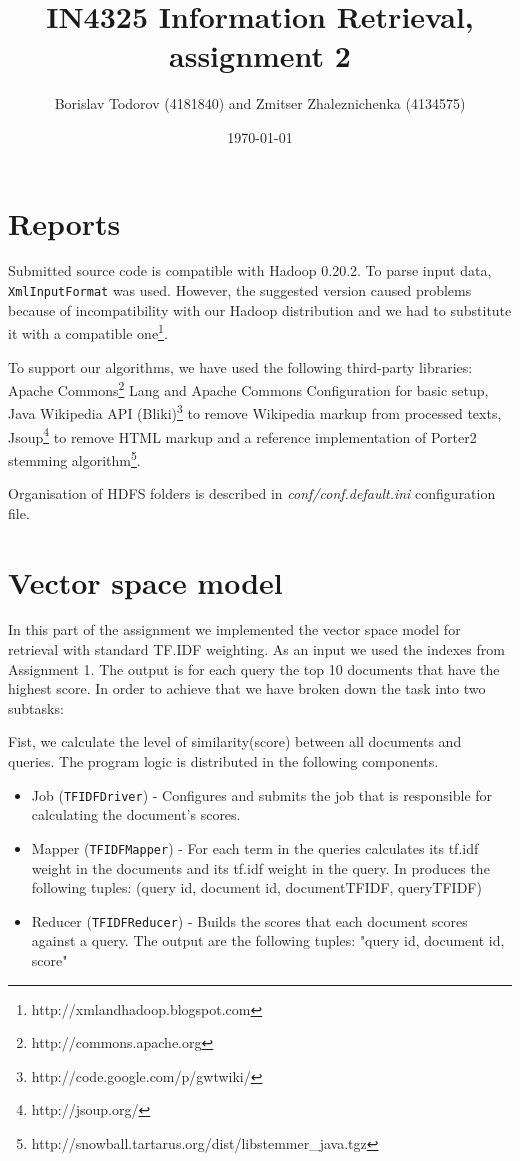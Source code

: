 \documentclass[a4paper, notitlepage]{article}
\begin{document}
\title{IN4325 Information Retrieval, assignment 2}
\author{Borislav Todorov (4181840) and Zmitser Zhaleznichenka (4134575)}
\date{\today}
\maketitle

\section{Reports}
Submitted source code is compatible with Hadoop 0.20.2. To parse input data, \lstinline{XmlInputFormat} was used. However, the suggested version caused problems because of incompatibility with our Hadoop distribution and we had to substitute it with a compatible one\footnote{http://xmlandhadoop.blogspot.com}.

To support our algorithms, we have used the following third-party libraries: Apache Commons\footnote{http://commons.apache.org} Lang and Apache Commons Configuration for basic setup, Java Wikipedia API (Bliki)\footnote{http://code.google.com/p/gwtwiki/} to remove Wikipedia markup from processed texts, Jsoup\footnote{http://jsoup.org/} to remove HTML markup and a reference implementation of Porter2 stemming algorithm\footnote{http://snowball.tartarus.org/dist/libstemmer\_java.tgz}.

Organisation of HDFS folders is described in \emph{conf/conf.default.ini} configuration file.

\section{Vector space model}
In this part of the assignment we implemented the vector space model for retrieval with standard TF.IDF weighting. As an input we used the indexes from Assignment 1. The output is for each query the top 10 documents that have the highest score. In order to achieve that we have broken down the task into two subtasks:

Fist, we calculate the level of similarity(score) between all documents and queries. The program logic is distributed in the following components.

\begin{itemize}
	\item Job (\lstinline{TFIDFDriver}) - Configures and submits the job that is responsible for calculating the document's scores.
	\item Mapper (\lstinline{TFIDFMapper}) - For each term in the queries calculates its tf.idf weight in the documents and its tf.idf weight in the query. In produces the following tuples: (query id, document id, documentTFIDF, queryTFIDF)
	\item Reducer (\lstinline{TFIDFReducer}) - Builds the scores that each document scores against a query. The output are the following tuples: "query id, document id, score"  
\end{itemize}
\end{document}
